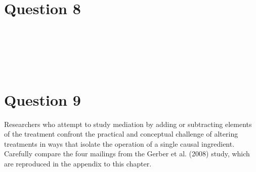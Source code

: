 \documentclass[11pt,notitlepage]{article}\usepackage[]{graphicx}\usepackage[]{color}
\makeatletter
\newenvironment{kframe}{%
 \def\at@end@of@kframe{}%
 \ifinner\ifhmode%
  \def\at@end@of@kframe{\end{minipage}}%
  \begin{minipage}{\columnwidth}%
 \fi\fi%
 \def\FrameCommand##1{\hskip\@totalleftmargin \hskip-\fboxsep
 \colorbox{shadecolor}{##1}\hskip-\fboxsep
     \hskip-\linewidth \hskip-\@totalleftmargin \hskip\columnwidth}%
 \MakeFramed {\advance\hsize-\width
   \@totalleftmargin\z@ \linewidth\hsize
   \@setminipage}}%
 {\par\unskip\endMakeFramed%
 \at@end@of@kframe}
\newenvironment{knitrout}{}{} %
\makeatother
\begin{document}
\section*{Question 8}
\begin{knitrout}
\color{fgcolor}\begin{kframe}
\begin{verbatim}






\end{verbatim}
\end{kframe}
\end{knitrout}


\section*{Question 9}
Researchers who attempt to study mediation by adding or subtracting elements of the treatment confront the practical and conceptual challenge of altering treatments in ways that isolate the operation of a single causal ingredient. Carefully compare the four mailings from the Gerber et al. (2008) study, which are reproduced in the appendix to this chapter.
\end{document}
